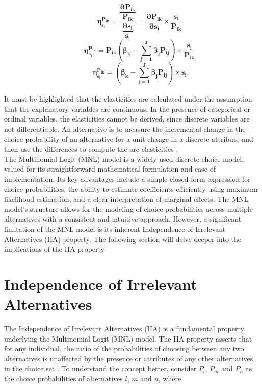 \documentclass[a4paper,11pt]{article}
\begin{document}
    \begin{equation*}
        \qquad \mathbf{\eta_{s_{i}}^{P_{ik}} = \dfrac{\dfrac{\partial P_{ik}}{P_{ik}}}{\dfrac{\partial s_{i}}{s_{i}}} = \dfrac{\partial P_{ik}}{\partial s_{i}} \times \dfrac{s_{i}}{P_{ik}}} 
    \end{equation*}
    \begin{equation*}
        \qquad \mathbf{\eta_{s_{i}}^{P_{ik}} = P_{ik} \left(\beta_{k} - \sum_{j = 1}^{J} \beta_{j}P_{ij}\right) \times \dfrac{s_{i}}{P_{ik}}} 
    \end{equation*}
    \begin{equation*}
        \qquad \mathbf{\eta_{s_{i}}^{P_{ik}} = \left(\beta_{k} - \sum_{j = 1}^{J} \beta_{j}P_{ij}\right) \times s_{i}} 
    \end{equation*}\\
    
    It must be highlighted that the elasticities are calculated under the assumption that the explanatory variables are continuous. In the presence of categorical or ordinal variables, the elasticities cannot be derived, since discrete variables are not differentiable. An alternative is to measure the incremental change in the choice probability of an alternative for a unit change in a discrete attribute and then use the differences to compute the arc elasticities \cite{Koppelman&Bhat}. \\
    
    The Multinomial Logit (MNL) model is a widely used discrete choice model, valued for its straightforward mathematical formulation and ease of implementation. Its key advantages include a simple closed-form expression for choice probabilities, the ability to estimate coefficients efficiently using maximum likelihood estimation, and a clear interpretation of marginal effects. The MNL model's structure allows for the modeling of choice probabilities across multiple alternatives with a consistent and intuitive approach. However, a significant limitation of the MNL model is its inherent Independence of Irrelevant Alternatives (IIA) property. The following section will delve deeper into the implications of the IIA property

\clearpage

\section{Independence of Irrelevant Alternatives}
\label{sec:IIA}

    The Independence of Irrelevant Alternatives (IIA) is a fundamental property underlying the Multinomial Logit (MNL) model. The IIA property asserts that for any individual, the ratio of the probabilities of choosing between any two alternatives is unaffected by the presence or attributes of any other alternatives in the choice set \cite{Croissant}. To understand the concept better, consider $P_{l}$, $P_{m}$ and $P_{n}$ as the choice probabilities of alternatives $l$, $m$ and $n$, where
\end{document}
